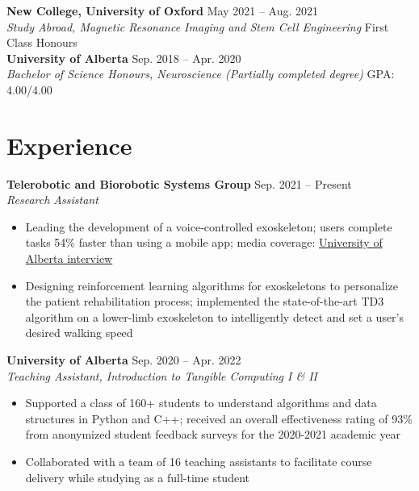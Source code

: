 \documentclass{article}
\begin{document}
\textbf{New College, University of Oxford} \hfill May 2021 -- Aug. 2021 \\
\textit{Study Abroad, Magnetic Resonance Imaging and Stem Cell Engineering} \hfill First Class Honours \\

\textbf{University of Alberta} \hfill Sep. 2018 -- Apr. 2020 \\
\textit{Bachelor of Science Honours, Neuroscience (Partially completed degree)} \hfill GPA: 4.00/4.00


\section*{\textcolor{my_colour}{Experience}}
\vspace{-.25em} \hrulefill \vspace{.25em}

\textbf{Telerobotic and Biorobotic Systems Group} \hfill Sep. 2021 -- Present\\
\textit{Research Assistant}
\begin{itemize}
    \item Leading the development of a voice-controlled exoskeleton; users complete tasks 54\% faster than using a mobile app; media coverage: \href{https://www.linkedin.com/posts/university-of-alberta_ai-voice-controlled-exoskeleton-activity-6954902847477997568-CTf4?utm_source=linkedin_share&utm_medium=member_desktop_web}{University of Alberta interview}
    \item Designing reinforcement learning algorithms for exoskeletons to personalize the patient rehabilitation process; implemented the state-of-the-art TD3 algorithm on a lower-limb exoskeleton to intelligently detect and set a user's desired walking speed
\end{itemize} \vspace{1em}

\textbf{University of Alberta} \hfill Sep. 2020 -- Apr. 2022 \\
\textit{Teaching Assistant, Introduction to Tangible Computing I \& II}
\begin{itemize}
    \item Supported a class of 160+ students to understand algorithms and data structures in Python and C++; received an overall effectiveness rating of 93\% from anonymized student feedback surveys for the 2020-2021 academic year
    \item Collaborated with a team of 16 teaching assistants to facilitate course delivery while studying as a full-time student
\end{itemize} \vspace{1em}
\end{document}
